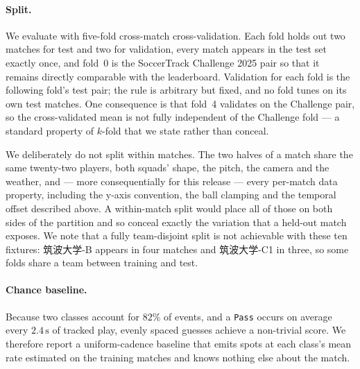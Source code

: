 \paragraph{Split.}
We evaluate with five-fold cross-match cross-validation. Each fold holds out two matches for
test and two for validation, every match appears in the test set exactly once, and fold~0 is
the SoccerTrack Challenge 2025 pair so that it remains directly comparable with the
leaderboard. Validation for each fold is the following fold's test pair; the rule is arbitrary
but fixed, and no fold tunes on its own test matches. One consequence is that fold~4 validates
on the Challenge pair, so the cross-validated mean is not fully independent of the Challenge
fold --- a standard property of $k$-fold that we state rather than conceal.

We deliberately do not split within matches. The two halves of a match share the same
twenty-two players, both squads' shape, the pitch, the camera and the weather, and --- more
consequentially for this release --- every per-match data property, including the y-axis
convention, the ball clamping and the temporal offset described above. A within-match split
would place all of those on both sides of the partition and so conceal exactly the variation
that a held-out match exposes. We note that a fully team-disjoint split is not achievable with
these ten fixtures: 筑波大学-B appears in four matches and 筑波大学-C1 in three, so some folds
share a team between training and test.

\paragraph{Chance baseline.}
Because two classes account for $82\%$ of events, and a \texttt{Pass} occurs on average every
$2.4\,\text{s}$ of tracked play, evenly spaced guesses achieve a non-trivial score. We
therefore report a uniform-cadence baseline that emits spots at each class's mean rate
estimated on the training matches and knows nothing else about the match.



